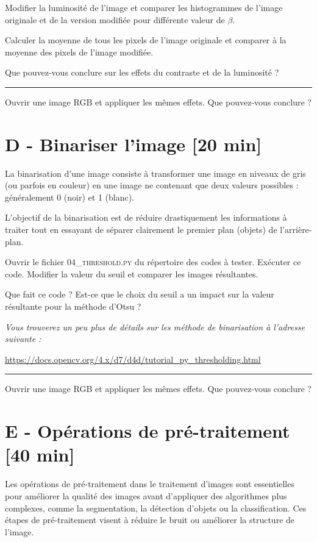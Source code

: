 \Manip Modifier la luminosité de l'image et comparer les histogrammes de l'image originale et de la version modifiée pour différente valeur de $\beta$. 

\Manip Calculer la moyenne de tous les pixels de l'image originale et comparer à la moyenne des pixels de l'image modifiée.

\Quest Que pouvez-vous conclure sur les effets du contraste et de la luminosité ?

\noindent \rule{\linewidth}{1pt}

\Manip Ouvrir une image RGB et appliquer les mêmes effets. Que pouvez-vous conclure ?


\section{D - Binariser l'image {[20 min]}}

La binarisation d'une image consiste à transformer une image en niveaux de gris (ou parfois en couleur) en une image ne contenant que deux valeurs possibles : généralement 0 (noir) et 1 (blanc).

L'objectif de la binarisation est de réduire drastiquement les informations à traiter tout en essayant de séparer clairement le premier plan (objets) de l'arrière-plan.

\medskip

\Manip Ouvrir le fichier \textsc{04\_threshold.py} du répertoire des codes à tester. Exécuter ce code. Modifier la valeur du seuil et comparer les images résultantes.

\Quest Que fait ce code ? Est-ce que le choix du seuil a un impact sur la valeur résultante pour la méthode d'Otsu ? 

\textit{Vous trouverez un peu plus de détails sur les méthode de binarisation à l'adresse suivante : } 

\href{https://docs.opencv.org/4.x/d7/d4d/tutorial_py_thresholding.html}{https://docs.opencv.org/4.x/d7/d4d/tutorial\_py\_thresholding.html}

\noindent \rule{\linewidth}{1pt}

\Manip Ouvrir une image RGB et appliquer les mêmes effets. Que pouvez-vous conclure ?


\newpage
\section{E - Opérations de pré-traitement {[40 min]}}
Les opérations de pré-traitement dans le traitement d'images sont essentielles pour améliorer la qualité des images avant d'appliquer des algorithmes plus complexes, comme la segmentation, la détection d'objets ou la classification. Ces étapes de pré-traitement visent à réduire le bruit ou améliorer la structure de
l'image.

